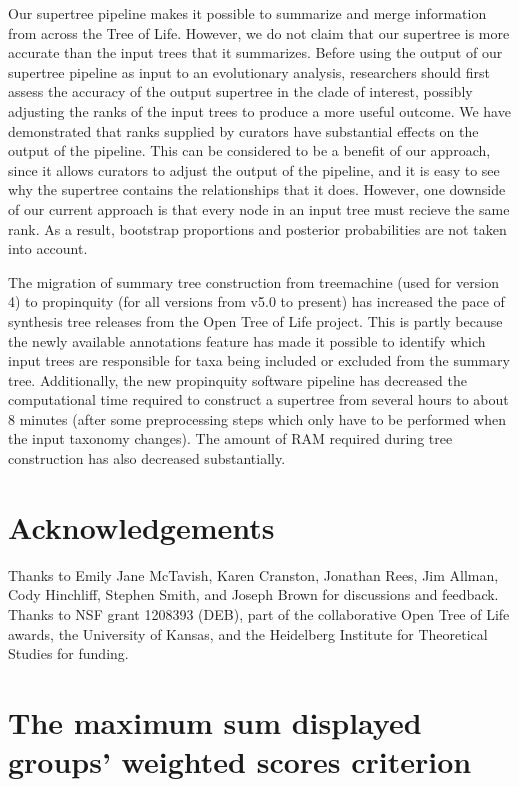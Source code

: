 \documentclass[fleqn,12pt,lineno,english]{wlpeerj}
\begin{document}
Our supertree pipeline makes it possible to summarize and merge
information from across the Tree of Life.  However, we do not claim
that our supertree is more accurate than the input trees that it
summarizes.  Before using the output of our supertree pipeline
as input to an evolutionary analysis, researchers should first assess
the accuracy of the output supertree in the clade of interest,
possibly adjusting the ranks of the input trees to produce a more
useful outcome.  We have demonstrated that ranks supplied by curators
have substantial effects on the output of the pipeline.  This
can be considered to be a benefit of our approach, since it allows
curators to adjust the output of the pipeline, and it is easy to see
why the supertree contains the relationships that it does.  However,
one downside of our current approach is that every node in an input
tree must recieve the same rank.  As a result, bootstrap proportions
and posterior probabilities are not taken into account.

The migration of summary tree construction from treemachine (used for
version 4) to propinquity (for all versions from v5.0 to present) has
increased the pace of synthesis tree releases from the Open Tree of
Life project.  This is partly because the newly available annotations
feature has made it possible to identify which input trees are
responsible for taxa being included or excluded from the summary tree.
Additionally, the new propinquity software pipeline has decreased
the computational time required to construct a supertree from several
hours to about 8 minutes (after some preprocessing steps which only
have to be performed when the input taxonomy changes).  The amount of
RAM required during tree construction has also decreased substantially. 

\section{Acknowledgements}

Thanks to Emily Jane McTavish, Karen Cranston, Jonathan Rees, Jim Allman, Cody Hinchliff,
Stephen Smith, and Joseph Brown for discussions and feedback. Thanks
to NSF grant 1208393 (DEB), part of the collaborative Open Tree of
Life awards, the University of Kansas, and the Heidelberg Institute
for Theoretical Studies for funding.





\appendix

\section{The maximum sum displayed groups' weighted scores criterion}\label{sec:The-maximum-sum}
\end{document}

